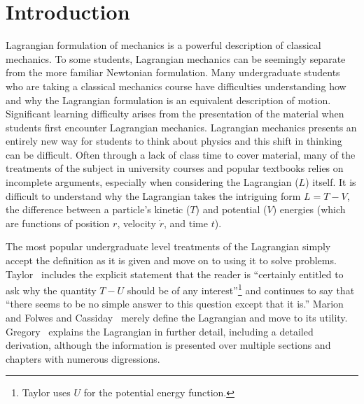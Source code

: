 \documentclass[prb,preprint]{revtex4-1}
\begin{document}
\maketitle



\section{Introduction}\label{introduction}

Lagrangian formulation of mechanics is a powerful description of classical mechanics. To some students, Lagrangian mechanics can be seemingly separate from the more familiar Newtonian formulation. Many undergraduate students who are taking a classical mechanics course have difficulties understanding how and why the Lagrangian formulation is an equivalent description of motion. Significant learning difficulty arises from the presentation of the material when students first encounter Lagrangian mechanics. Lagrangian mechanics presents an entirely new way for students to think about physics and this shift in thinking can be difficult. Often through a lack of class time to cover material, many of the treatments of the subject in university courses and popular textbooks relies on incomplete arguments, especially when considering the Lagrangian ($L$) itself. It is difficult to understand why the Lagrangian takes the intriguing form $L=T-V$, the difference between a particle's kinetic ($T$) and potential ($V$) energies (which are functions of position \boldmath$r$\unboldmath, velocity \boldmath$\dot{r}$\unboldmath, and time $t$). 

The most popular undergraduate level treatments of the Lagrangian simply accept the definition as it is given and move on to using it to solve problems. Taylor~\cite[p.~238]{taylor2005classical} includes the explicit statement that the reader is ``certainly entitled to ask why the quantity $T-U$ should be of any interest''\footnote{Taylor uses $U$ for the potential energy function.} and continues to say that ``there seems to be no simple answer to this question except that it is.'' Marion ~\cite[p.~198-199]{marion1970classical} and Folwes and Cassiday~\cite[p.~393]{fowles1999analytical} merely define the Lagrangian and move to its utility. Gregory~\cite[p.~348]{gregory2006classical} explains the Lagrangian in further detail, including a detailed derivation, although the information is presented over multiple sections and chapters with numerous digressions.
\end{document}
